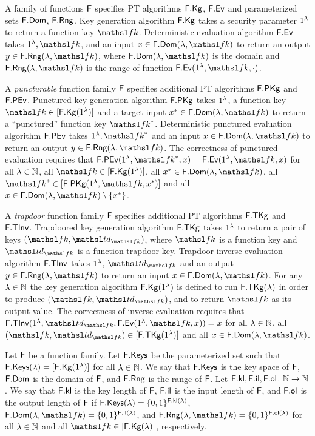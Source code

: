 
A family of functions $\mathsf{F}$ specifies PT algorithms $\mathsf{F}.\mathsf{Kg}$, $\mathsf{F}.\mathsf{Ev}$ and parameterized sets $\mathsf{F}.\mathsf{Dom}$, $\mathsf{F}.\mathsf{Rng}$.
Key generation algorithm $\mathsf{F}.\mathsf{Kg}$ takes a security parameter $1^\lambda$ to return a function key $\FKey$.
Deterministic evaluation algorithm $\mathsf{F}.\mathsf{Ev}$ takes $\secIn, \FKey$, and an input $x\in\Dom{\FF}(\secParam, \FKey)$ to return an output $y\in\Rng{\FF}(\secParam, \FKey)$, where $\Dom{\FF}(\secParam, \FKey)$ is the domain and $\Rng{\FF}(\secParam, \FKey)$ is the range of function $\Ev{\FF}(\secIn, \FKey, \cdot)$.

A \emph{puncturable} function family $\mathsf{F}$ specifies additional PT algorithms $\mathsf{F}.\mathsf{PKg}$ and $\mathsf{F}.\mathsf{PEv}$.
Punctured key generation algorithm $\mathsf{F}.\mathsf{PKg}$ takes $1^\lambda$, a function key $\FKey\in[\Kg{\FF}(\secIn)]$ and a target input $x^*\in\Dom{\FF}(\secParam,\FKey)$ to return a ``punctured'' function key $\PFKey$.
Deterministic punctured evaluation algorithm $\mathsf{F}.\mathsf{PEv}$ takes $\secIn, \PFKey$ and an input $x\in\Dom{\FF}(\secParam,\FKey)$ to return an output $y\in\Rng{\FF}(\secParam, \FKey)$.
The correctness of punctured evaluation requires that $\PEv{\FF}(\secIn, \PFKey, x) = \Ev{\FF}(\secIn, \FKey, x)$ for
  all $\lambda\in{{\mathbb N}}$,
  all $\FKey\in[\Kg{\FF}(\secIn)]$,
  all $x^*\in\Dom{\FF}(\secParam, \FKey)$,
  all $\PFKey\in[\PKg{\FF}(\secIn, \FKey, x^*)]$
  and all $x\in\Dom{\FF}(\secParam, \FKey)\setminus\{x^*\}$.

A \emph{trapdoor} function family $\mathsf{F}$ specifies additional PT algorithms $\mathsf{F}.\mathsf{TKg}$ and $\mathsf{F}.\mathsf{TInv}$.
Trapdoored key generation algorithm $\mathsf{F}.\mathsf{TKg}$ takes $1^\lambda$ to return a pair of keys $(\FKey, \TFKey)$, where $\FKey$ is a function key and $\TFKey$ is a function trapdoor key.
Trapdoor inverse evaluation algorithm $\mathsf{F}.\mathsf{TInv}$ takes $1^\lambda$, $\TFKey$ and an output $y\in\Rng{\FF}(\secParam, \FKey)$ to return an input $x\in\Dom{\FF}(\secParam, \FKey)$.
For any $\lambda\in{{\mathbb N}}$ the key generation algorithm $\mathsf{F}.\mathsf{Kg}(1^\lambda)$ is defined to run $\mathsf{F}.\mathsf{TKg}(\lambda)$ in order to produce $(\FKey, \TFKey)$, and to return $\FKey$ as its output value.
The correctness of inverse evaluation requires that $\TInv{\FF}(\secIn, \TFKey, \Ev{\FF}(\secIn, \FKey, x)) = x$ for all $\lambda\in{{\mathbb N}}$, all $(\FKey, \TFKey)\in[\TKg{\FF}(\secIn)]$ and all $x\in\Dom{\FF}(\secParam, \FKey)$.

Let $\mathsf{F}$ be a function family.
Let $\mathsf{F}.\mathsf{Keys}$ be the parameterized set such that $\mathsf{F}.\mathsf{Keys}(\lambda) = [\mathsf{F}.\mathsf{Kg}(1^\lambda)]$ for all $\lambda\in{{\mathbb N}}$.
We say that $\mathsf{F}.\mathsf{Keys}$ is the key space of $\mathsf{F}$, $\mathsf{F}.\mathsf{Dom}$ is the domain of $\mathsf{F}$, and $\mathsf{F}.\mathsf{Rng}$ is the range of $\mathsf{F}$.
Let $\mathsf{F}.\mathsf{kl},\mathsf{F}.\mathsf{il},\mathsf{F}.\mathsf{ol}\colon{{\mathbb N}}\to{{\mathbb N}}$. 
We say that $\mathsf{F}.\mathsf{kl}$ is the key length of $\mathsf{F}$, $\mathsf{F}.\mathsf{il}$ is the input length of $\mathsf{F}$, and $\mathsf{F}.\mathsf{ol}$ is the output length of $\mathsf{F}$ if $\mathsf{F}.\mathsf{Keys}(\lambda) = \{0,1\}^{\mathsf{F}.\mathsf{kl}(\lambda)}$, $\Dom{\FF}(\secParam,\FKey) = \bits^{\il{\FF}(\secParam)}$, and $\Rng{\FF}(\secParam, \FKey) = \bits^{\ol{\FF}(\secParam)}$ for all $\lambda\in{{\mathbb N}}$ and all $\FKey\in[\Kg{\FF}(\secParam)]$, respectively.

